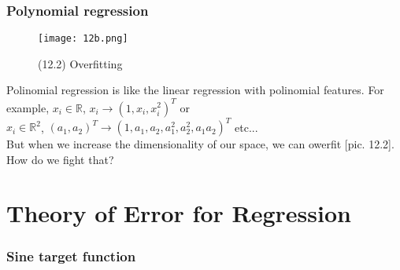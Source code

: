 \subsubsection*{Polynomial regression}

\begin{wrapfigure}{r}{0.25\linewidth}
	\vspace{-2.5cm}
  \begin{center}
    \texttt{[image: 12b.png]}
  \end{center}
  \vspace{-0.8cm}
  \caption*{(12.2) Overfitting}
  \vspace{-2cm}
\end{wrapfigure}
Polinomial regression is like the linear regression with polinomial features. For example, $x_i\in\mathbb{R}$, $x_i\to(1,x_i,x_i^2)^T$ or \\
$x_i\in\mathbb{R}^2$, $(a_1, a_2)^T\to(1,a_1,a_2,a_1^2,a_2^2,a_1a_2)^T$ etc...\\
But when we increase the dimensionality of our space, we can owerfit [pic. 12.2]. How do we fight that?

\newpage
\section{Theory of Error for Regression}
\vspace{-0.6cm}
\subsubsection*{Sine target function}

